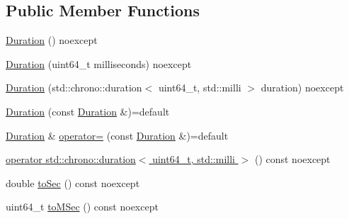 \subsection*{Public Member Functions}
\begin{DoxyCompactItemize}
\item 
\hyperlink{classfranka_1_1Duration_af721da321423772b4ce7ff11280d38d5}{Duration} () noexcept
\item 
\hyperlink{classfranka_1_1Duration_a46f0cea3e05c27cdaaba5ff25e0e6cd6}{Duration} (uint64\+\_\+t milliseconds) noexcept
\item 
\hyperlink{classfranka_1_1Duration_a389dfef50f34e9cc5be69838fbdafba7}{Duration} (std\+::chrono\+::duration$<$ uint64\+\_\+t, std\+::milli $>$ duration) noexcept
\item 
\hyperlink{classfranka_1_1Duration_a886575e716b45e85de1bb78def2eb133}{Duration} (const \hyperlink{classfranka_1_1Duration}{Duration} \&)=default
\item 
\hyperlink{classfranka_1_1Duration}{Duration} \& \hyperlink{classfranka_1_1Duration_adf2fec0c87fe1668e42f217ab029df19}{operator=} (const \hyperlink{classfranka_1_1Duration}{Duration} \&)=default
\item 
\hyperlink{classfranka_1_1Duration_ae58e283f511f9de8ac7e145db5cac1cf}{operator std\+::chrono\+::duration$<$ uint64\+\_\+t, std\+::milli $>$} () const noexcept
\item 
double \hyperlink{classfranka_1_1Duration_a497af77a3280159547f231f0374e9ac1}{to\+Sec} () const noexcept
\item 
uint64\+\_\+t \hyperlink{classfranka_1_1Duration_a2a25ae33c8739b8f705f13798aa9e162}{to\+M\+Sec} () const noexcept
\end{DoxyCompactItemize}
